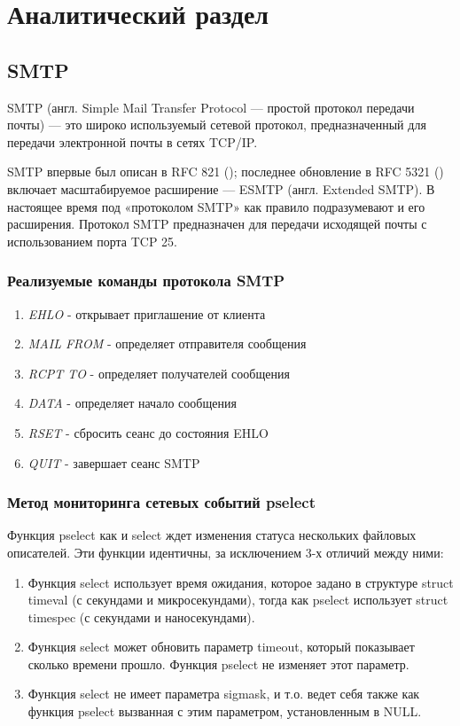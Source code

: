 \documentclass[a4paper,12pt]{report}
\begin{document}
\chapter{Аналитический раздел}

\section{SMTP}
SMTP (англ. Simple Mail Transfer Protocol — простой протокол передачи почты) — это широко используемый сетевой
протокол, предназначенный для передачи электронной почты в сетях TCP/IP.

SMTP впервые был описан в RFC 821 (\cite{rfc821}); последнее обновление в RFC 5321 (\cite{rfc5321}) включает масштабируемое
расширение — ESMTP (англ.  Extended SMTP). В настоящее время под «протоколом SMTP» как правило подразумевают
и его расширения. Протокол SMTP предназначен для передачи исходящей почты с использованием порта TCP 25.

\subsection{Реализуемые команды протокола SMTP}
\begin{enumerate}
    \item \textit{EHLO} - открывает приглашение от клиента
    \item \textit{MAIL FROM} - определяет отправителя сообщения
    \item \textit{RCPT TO} - определяет получателей сообщения
    \item \textit{DATA} - определяет начало сообщения
    \item \textit{RSET} - сбросить сеанс до состояния EHLO
    \item \textit{QUIT} - завершает сеанс SMTP
\end{enumerate}


\subsection{Метод мониторинга сетевых событий pselect}
Функция pselect как и select ждет изменения статуса нескольких файловых описателей.
Эти функции идентичны, за исключением 3-х отличий между ними:
\begin{enumerate}
\item Функция select использует время ожидания, которое задано в структуре struct timeval (с секундами и микросекундами), тогда как pselect использует struct timespec (с секундами и наносекундами).
\item Функция select может обновить параметр timeout, который показывает сколько времени прошло. Функция pselect не изменяет этот параметр.
\item Функция select не имеет параметра sigmask, и т.о. ведет себя также как функция pselect вызванная с этим параметром, установленным в NULL.
\end{enumerate}
\end{document}

